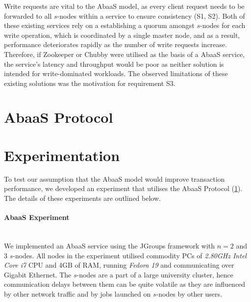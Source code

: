 Write requests are vital to the \textsf{AbaaS} model, as every client request needs to be forwarded to all $s$-nodes within a service to ensure consistency (S1, S2).  Both of these existing services rely on a establishing a quorum amongst $s$-nodes for each write operation, which is coordinated by a single master node, and as a result, performance deteriorates rapidly as the number of write requests increase.  Therefore, if Zookeeper or Chubby were utilised as the basis of a \textsf{AbaaS} service, the service's latency and throughput would be poor as neither solution is intended for write-dominated workloads.  The observed limitations of these existing solutions was the motivation for requirement S3.  

\section{AbaaS Protocol}\label{sec:decoupled_protocol}


\section{Experimentation}

To test our assumption that the \textsf{AbaaS} model would improve transaction performance, we developed an experiment that utilises the \textsf{AbaaS} Protocol (\ref{sec:decoupled_protocol}).  The details of these experiments are outlined below. 

\paragraph{AbaaS Experiment} \hspace{0pt} \\
We implemented an \textsf{AbaaS} service using the JGroups\citep{JGroups} framework with $n=2$ and $3$ $s$-nodes.  All nodes in the experiment utilised commodity PCs of \emph{2.80GHz Intel Core i7} CPU and 4GB of RAM, running \emph{Fedora 19} and communicating over Gigabit Ethernet. The $s$-nodes are a part of a large university cluster, hence communication delays between them can be quite volatile as they are influenced by other network traffic and by jobs launched on $s$-nodes by other users.

